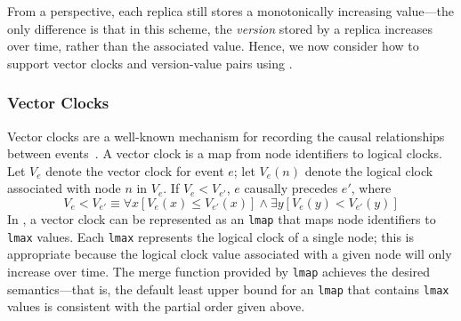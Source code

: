From a \lang perspective, each replica still stores a monotonically increasing
value---the only difference is that in this scheme, the \emph{version} stored by
a replica increases over time, rather than the associated value. Hence, we now
consider how to support vector clocks and version-value pairs using \lang.

\subsubsection{Vector Clocks}
Vector clocks are a well-known mechanism for recording the causal relationships
between events~\cite{Fidge1988,Lamport1978}. A vector clock is a map from node
identifiers to logical clocks. Let $V_e$ denote the vector clock for event $e$;
let $V_e(n)$ denote the logical clock associated with node $n$ in $V_e$. If $V_e
< V_{e'}$, $e$ causally precedes $e'$, where
\begin{displaymath}
V_e < V_{e'} \equiv \forall x [ V_e(x) \leq V_{e'}(x) ] \land \exists y [ V_e(y) < V_{e'}(y) ]  
\end{displaymath}
In \lang, a vector clock can be represented as an \texttt{lmap} that maps node
identifiers to \texttt{lmax} values. Each \texttt{lmax} represents the logical
clock of a single node; this is appropriate because the logical clock value
associated with a given node will only increase over time. The merge function
provided by \texttt{lmap} achieves the desired semantics---that is, the default
least upper bound for an \texttt{lmap} that contains \texttt{lmax} values is
consistent with the partial order given above.

